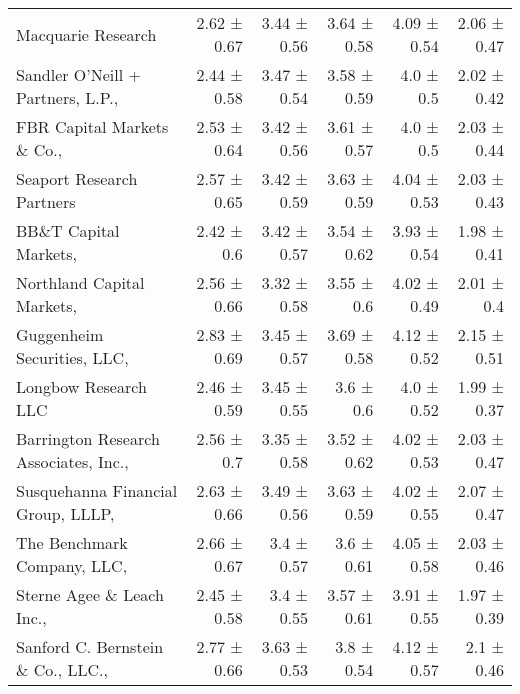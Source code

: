 \begin{tabular}{lrrrrr}
Macquarie Research & 2.62 ± 0.67 & 3.44 ± 0.56 & 3.64 ± 0.58 & 4.09 ± 0.54 & 2.06 ± 0.47 \\
Sandler O'Neill + Partners, L.P.,  & 2.44 ± 0.58 & 3.47 ± 0.54 & 3.58 ± 0.59 & 4.0 ± 0.5 & 2.02 ± 0.42 \\
FBR Capital Markets \& Co.,  & 2.53 ± 0.64 & 3.42 ± 0.56 & 3.61 ± 0.57 & 4.0 ± 0.5 & 2.03 ± 0.44 \\
Seaport Research Partners & 2.57 ± 0.65 & 3.42 ± 0.59 & 3.63 ± 0.59 & 4.04 ± 0.53 & 2.03 ± 0.43 \\
BB\&T Capital Markets,  & 2.42 ± 0.6 & 3.42 ± 0.57 & 3.54 ± 0.62 & 3.93 ± 0.54 & 1.98 ± 0.41 \\
Northland Capital Markets,  & 2.56 ± 0.66 & 3.32 ± 0.58 & 3.55 ± 0.6 & 4.02 ± 0.49 & 2.01 ± 0.4 \\
Guggenheim Securities, LLC,  & 2.83 ± 0.69 & 3.45 ± 0.57 & 3.69 ± 0.58 & 4.12 ± 0.52 & 2.15 ± 0.51 \\
Longbow Research LLC & 2.46 ± 0.59 & 3.45 ± 0.55 & 3.6 ± 0.6 & 4.0 ± 0.52 & 1.99 ± 0.37 \\
Barrington Research Associates, Inc.,  & 2.56 ± 0.7 & 3.35 ± 0.58 & 3.52 ± 0.62 & 4.02 ± 0.53 & 2.03 ± 0.47 \\
Susquehanna Financial Group, LLLP,  & 2.63 ± 0.66 & 3.49 ± 0.56 & 3.63 ± 0.59 & 4.02 ± 0.55 & 2.07 ± 0.47 \\
The Benchmark Company, LLC,  & 2.66 ± 0.67 & 3.4 ± 0.57 & 3.6 ± 0.61 & 4.05 ± 0.58 & 2.03 ± 0.46 \\
Sterne Agee \& Leach Inc.,  & 2.45 ± 0.58 & 3.4 ± 0.55 & 3.57 ± 0.61 & 3.91 ± 0.55 & 1.97 ± 0.39 \\
Sanford C. Bernstein \& Co., LLC.,  & 2.77 ± 0.66 & 3.63 ± 0.53 & 3.8 ± 0.54 & 4.12 ± 0.57 & 2.1 ± 0.46 \\
\bottomrule
\end{tabular}
